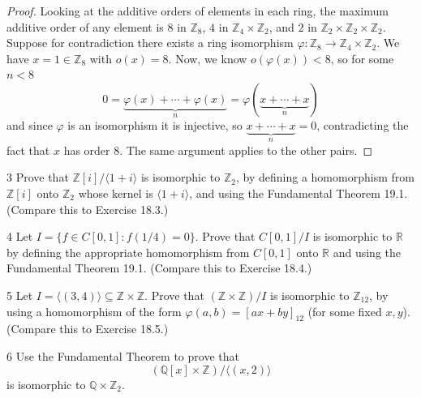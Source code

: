 \begin{proof}
    Looking at the additive orders of elements in each ring,
    the maximum additive order of any element 
        is $8$ in $\mathbb{Z}_8$, $4$ in $\mathbb{Z}_4 \times \mathbb{Z}_2$, 
        and $2$ in $\mathbb{Z}_2 \times \mathbb{Z}_2 \times \mathbb{Z}_2$.
    Suppose for contradiction there exists a ring isomorphism 
        $\varphi : \mathbb{Z}_8 \to \mathbb{Z}_4 \times \mathbb{Z}_2$. 
    We have $x = 1 \in \mathbb{Z}_8$ with $o(x) = 8$. Now, we know $o(\varphi(x)) < 8$, so for some $n < 8$
    \[
    0 = \underbrace{\varphi(x) + \cdots + \varphi(x)}_{n} = \varphi(\underbrace{x + \cdots + x}_{n})
    \]
    and since $\varphi$ is an isomorphism it is injective,
    so $\underbrace{x + \cdots + x}_{n} = 0$, 
    contradicting the fact that $x$ has order $8$. 
    The same argument applies to the other pairs.
\end{proof}

\newpage

\begin{problem}{3}
    Prove that $\mathbb{Z}[i]/\langle 1 + i \rangle$ is isomorphic to $\mathbb{Z}_2$, by
    defining a homomorphism from $\mathbb{Z}[i]$ onto $\mathbb{Z}_2$ whose kernel is
    $\langle 1 + i \rangle$, and using the Fundamental Theorem 19.1. (Compare this to
    Exercise 18.3.)
\end{problem}
\unsolved

\begin{problem}{4}
    Let $I = \{f \in C[0, 1] : f(1/4) = 0\}$. Prove that $C[0, 1]/I$ is isomorphic to
    $\mathbb{R}$ by defining the appropriate homomorphism from $C[0, 1]$ onto $\mathbb{R}$
    and using the Fundamental Theorem 19.1. (Compare this to Exercise 18.4.)
\end{problem}
\unsolved

\begin{problem}{5}
    Let $I = \langle (3, 4) \rangle \subseteq \mathbb{Z} \times \mathbb{Z}$. Prove that
    $(\mathbb{Z} \times \mathbb{Z})/I$ is isomorphic to $\mathbb{Z}_{12}$, by using a
    homomorphism of the form $\varphi(a, b) = [ax + by]_{12}$ (for some fixed $x, y$).
    (Compare this to Exercise 18.5.)
\end{problem}
\unsolved

\begin{problem}{6}
    Use the Fundamental Theorem to prove that
    \[(\mathbb{Q}[x] \times \mathbb{Z})/\langle (x, 2) \rangle\]
    is isomorphic to $\mathbb{Q} \times \mathbb{Z}_2$.
\end{problem}
\unsolved

